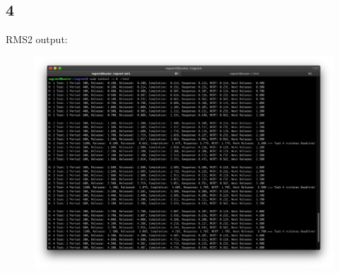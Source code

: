 \documentclass[12pt]{article}
\begin{document}
\subsection*{4}
RMS2 output:
\begin{figure}[H]
        \includegraphics[width=\linewidth]{4-rms2-output}
\end{figure}
\end{document}
